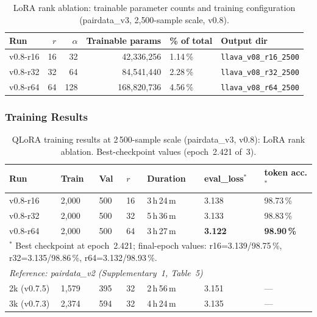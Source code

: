 \documentclass[onecolumn]{article}
\begin{document}
\begin{table}[h]
\centering
\caption{LoRA rank ablation: trainable parameter counts and training configuration
         (pairdata\_v3, 2{,}500-sample scale, v0.8).}
\label{tab:u4_ablation_config}
\small
\begin{tabular}{lrrrll}
\toprule
\textbf{Run} & $r$ & $\alpha$ & \textbf{Trainable params} & \textbf{\% of total} & \textbf{Output dir} \\
\midrule
v0.8-r16 & 16 & 32 & 42{,}336{,}256 & 1.14\,\% & \texttt{llava\_v08\_r16\_2500} \\
v0.8-r32 & 32 & 64 & 84{,}541{,}440 & 2.28\,\% & \texttt{llava\_v08\_r32\_2500} \\
v0.8-r64 & 64 & 128 & 168{,}820{,}736 & 4.56\,\% & \texttt{llava\_v08\_r64\_2500} \\
\bottomrule
\end{tabular}
\end{table}

\subsubsection*{Training Results}

\begin{table}[h]
\centering
\caption{QLoRA training results at 2\,500-sample scale (pairdata\_v3, v0.8):
         LoRA rank ablation. Best-checkpoint values (epoch~2.421 of~3).}
\label{tab:u4_results}
\small
\begin{tabular}{lllllll}
\toprule
\textbf{Run} & \textbf{Train} & \textbf{Val} & $r$ & \textbf{Duration} & \textbf{eval\_loss$^*$} & \textbf{token acc.$^*$} \\
\midrule
v0.8-r16 & 2,000 & 500 & 16 & 3\,h\,24\,m & 3.138 & 98.73\,\% \\
v0.8-r32 & 2,000 & 500 & 32 & 5\,h\,36\,m & 3.133 & 98.83\,\% \\
v0.8-r64 & 2,000 & 500 & 64 & 3\,h\,27\,m & \textbf{3.122} & \textbf{98.90\,\%} \\
\midrule
\multicolumn{7}{l}{$^*$ Best checkpoint at epoch~2.421; final-epoch values: r16=3.139/98.75\,\%, r32=3.135/98.86\,\%, r64=3.132/98.93\,\%.} \\
\multicolumn{7}{l}{\textit{Reference: pairdata\_v2 (Supplementary~1, Table~5)}} \\
2k (v0.7.5) & 1,579 & 395 & 32 & 2\,h\,56\,m & 3.151 & --- \\
3k (v0.7.3) & 2,374 & 594 & 32 & 4\,h\,24\,m & 3.135 & --- \\
\bottomrule
\end{tabular}
\end{table}
\end{document}
